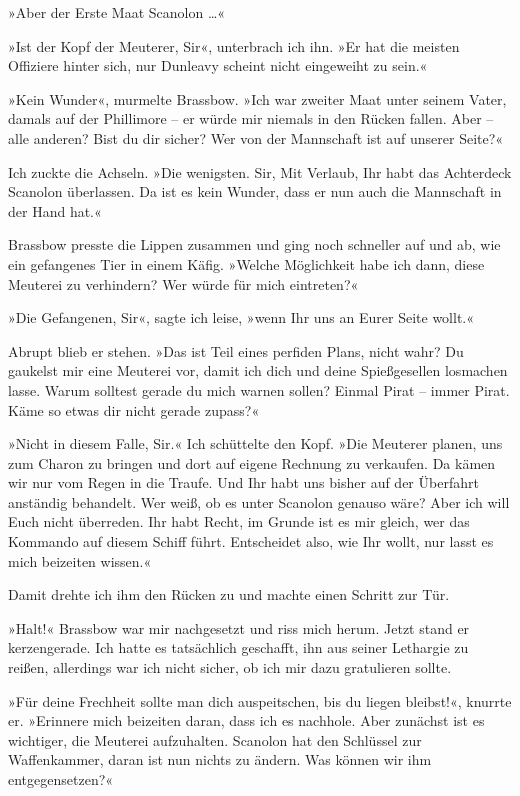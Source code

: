 »Aber der Erste Maat Scanolon \ldots{}«

»Ist der Kopf der Meuterer, Sir«, unterbrach ich ihn. »Er hat die
meisten Offiziere hinter sich, nur Dunleavy scheint nicht
eingeweiht zu sein.«

»Kein Wunder«, murmelte Brassbow. »Ich war zweiter Maat unter
seinem Vater, damals auf der Phillimore – er würde mir niemals in
den Rücken fallen. Aber – alle anderen? Bist du dir sicher? Wer von
der Mannschaft ist auf unserer Seite?«

Ich zuckte die Achseln. »Die wenigsten. Sir, Mit Verlaub, Ihr habt
das Achterdeck Scanolon überlassen. Da ist es kein Wunder, dass er
nun auch die Mannschaft in der Hand hat.«

Brassbow presste die Lippen zusammen und ging noch schneller auf
und ab, wie ein gefangenes Tier in einem Käfig. »Welche Möglichkeit
habe ich dann, diese Meuterei zu verhindern? Wer würde für mich
eintreten?«

»Die Gefangenen, Sir«, sagte ich leise, »wenn Ihr uns an Eurer
Seite wollt.«

Abrupt blieb er stehen. »Das ist Teil eines perfiden Plans, nicht
wahr? Du gaukelst mir eine Meuterei vor, damit ich dich und deine
Spießgesellen losmachen lasse. Warum solltest gerade du mich warnen
sollen? Einmal Pirat – immer Pirat. Käme so etwas dir nicht gerade
zupass?«

»Nicht in diesem Falle, Sir.« Ich schüttelte den Kopf. »Die
Meuterer planen, uns zum Charon zu bringen und dort auf eigene
Rechnung zu verkaufen. Da kämen wir nur vom Regen in die Traufe.
Und Ihr habt uns bisher auf der Überfahrt anständig behandelt. Wer
weiß, ob es unter Scanolon genauso wäre? Aber ich will Euch nicht
überreden. Ihr habt Recht, im Grunde ist es mir gleich, wer das
Kommando auf diesem Schiff führt. Entscheidet also, wie Ihr wollt,
nur lasst es mich beizeiten wissen.«

Damit drehte ich ihm den Rücken zu und machte einen Schritt zur
Tür.

\bigpar

»Halt!« Brassbow war mir nachgesetzt und riss mich herum. Jetzt
stand er kerzengerade. Ich hatte es tatsächlich geschafft, ihn aus
seiner Lethargie zu reißen, allerdings war ich nicht sicher, ob ich
mir dazu gratulieren sollte.

»Für deine Frechheit sollte man dich auspeitschen, bis du liegen
bleibst!«, knurrte er. »Erinnere mich beizeiten daran, dass ich es
nachhole. Aber zunächst ist es wichtiger, die Meuterei aufzuhalten.
Scanolon hat den Schlüssel zur Waffenkammer, daran ist nun nichts
zu ändern. Was können wir ihm entgegensetzen?«

